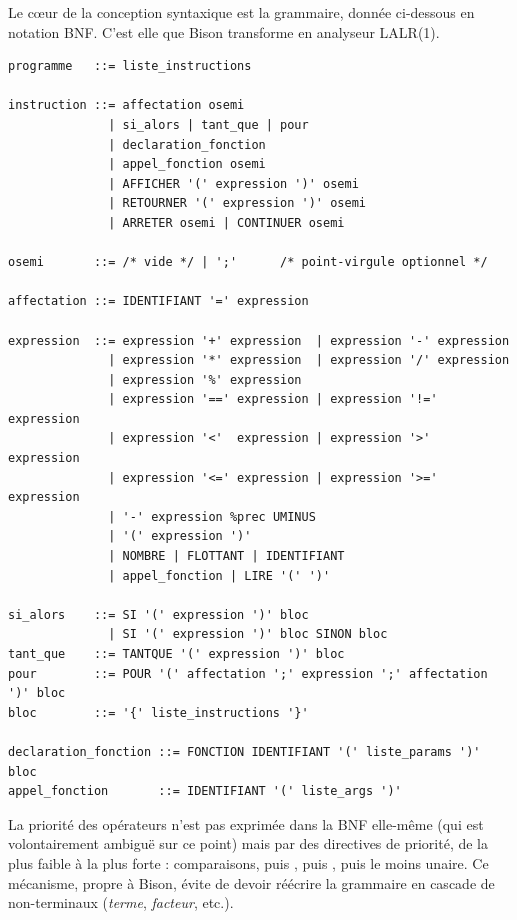 Le c\oe ur de la conception syntaxique est la grammaire, donnée ci-dessous en
notation BNF. C'est elle que Bison transforme en analyseur LALR(1).

\begin{lstlisting}[style=gram,caption={Grammaire BNF d'\ilang.},label={lst:bnf}]
programme   ::= liste_instructions

instruction ::= affectation osemi
              | si_alors | tant_que | pour
              | declaration_fonction
              | appel_fonction osemi
              | AFFICHER '(' expression ')' osemi
              | RETOURNER '(' expression ')' osemi
              | ARRETER osemi | CONTINUER osemi

osemi       ::= /* vide */ | ';'      /* point-virgule optionnel */

affectation ::= IDENTIFIANT '=' expression

expression  ::= expression '+' expression  | expression '-' expression
              | expression '*' expression  | expression '/' expression
              | expression '%' expression
              | expression '==' expression | expression '!=' expression
              | expression '<'  expression | expression '>'  expression
              | expression '<=' expression | expression '>=' expression
              | '-' expression %prec UMINUS
              | '(' expression ')'
              | NOMBRE | FLOTTANT | IDENTIFIANT
              | appel_fonction | LIRE '(' ')'

si_alors    ::= SI '(' expression ')' bloc
              | SI '(' expression ')' bloc SINON bloc
tant_que    ::= TANTQUE '(' expression ')' bloc
pour        ::= POUR '(' affectation ';' expression ';' affectation ')' bloc
bloc        ::= '{' liste_instructions '}'

declaration_fonction ::= FONCTION IDENTIFIANT '(' liste_params ')' bloc
appel_fonction       ::= IDENTIFIANT '(' liste_args ')'
\end{lstlisting}

La priorité des opérateurs n'est pas exprimée dans la BNF elle-même (qui est
volontairement ambiguë sur ce point) mais par des directives de priorité, de la
plus faible à la plus forte : comparaisons, puis \code{+ -}, puis \code{* / \%},
puis le moins unaire. Ce mécanisme, propre à Bison, évite de devoir réécrire la
grammaire en cascade de non-terminaux (\emph{terme}, \emph{facteur}, etc.).

